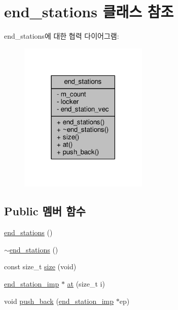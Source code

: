 \hypertarget{classavdecc__lib_1_1end__stations}{}\section{end\+\_\+stations 클래스 참조}
\label{classavdecc__lib_1_1end__stations}


end\+\_\+stations에 대한 협력 다이어그램\+:
\nopagebreak
\begin{figure}[H]
\begin{center}
\leavevmode
\includegraphics[width=174pt]{classavdecc__lib_1_1end__stations__coll__graph}
\end{center}
\end{figure}
\subsection*{Public 멤버 함수}
\begin{DoxyCompactItemize}
\item 
\hyperlink{classavdecc__lib_1_1end__stations_a2c27fa06a8ff839e8b4c01501861ac7e}{end\+\_\+stations} ()
\item 
\hyperlink{classavdecc__lib_1_1end__stations_a5bdf6ed9941aeaea0635800490a99ec7}{$\sim$end\+\_\+stations} ()
\item 
const size\+\_\+t \hyperlink{classavdecc__lib_1_1end__stations_ad26f04adc7ec92298de9de96b7879779}{size} (void)
\item 
\hyperlink{classavdecc__lib_1_1end__station__imp}{end\+\_\+station\+\_\+imp} $\ast$ \hyperlink{classavdecc__lib_1_1end__stations_a8b2053474417f106d063017c5b60bad2}{at} (size\+\_\+t i)
\item 
void \hyperlink{classavdecc__lib_1_1end__stations_a5f467fdc6b4fd96dcb3c2f9736a417f4}{push\+\_\+back} (\hyperlink{classavdecc__lib_1_1end__station__imp}{end\+\_\+station\+\_\+imp} $\ast$ep)
\end{DoxyCompactItemize}
